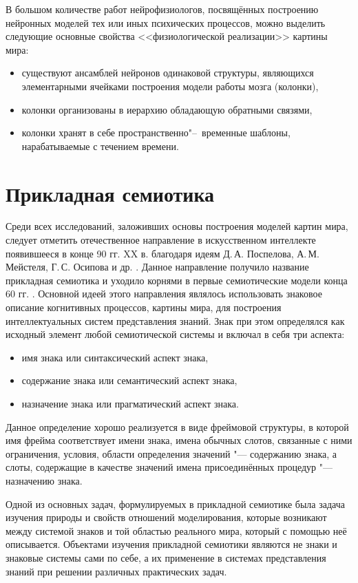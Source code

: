 В большом количестве работ нейрофизиологов, посвящённых построению нейронных моделей тех или иных психических процессов, можно выделить следующие основные свойства <<физиологической реализации>> картины мира:
\begin{itemize}
	\item существуют ансамблей нейронов одинаковой структуры, являющихся элементарными ячейками построения модели работы мозга (колонки),
	\item колонки организованы в иерархию обладающую обратными связями,
	\item колонки хранят в себе пространственно"--~временные шаблоны, нарабатываемые с течением времени.
\end{itemize}

\section{Прикладная семиотика} \label{sect1_3}

Среди всех исследований, заложивших основы построения моделей картин мира, следует отметить отечественное направление в искусственном интеллекте появившееся в конце 90 гг. XX в. благодаря идеям Д.\,А. Поспелова, А.\,М. Мейстеля, Г.\,С. Осипова и др. \cite{Osipov1995,Pospelov1996,Ehrlich1997,Osipov1999,Osipov2000b,Osipov2002a,Osipov2002b}. Данное направление получило название прикладная семиотика и уходило корнями в первые семиотические модели конца 60 гг. \cite{Pospelov1976}. Основной идеей этого направления являлось использовать знаковое описание когнитивных процессов, картины мира, для построения интеллектуальных систем представления знаний. Знак при этом определялся как исходный элемент любой семиотической системы и включал в себя три аспекта:
\begin{itemize}
	\item имя знака или синтаксический аспект знака,
	\item содержание знака или семантический аспект знака,
	\item назначение знака или прагматический аспект знака.
\end{itemize}
Данное определение хорошо реализуется в виде фреймовой структуры, в которой имя фрейма соответствует имени знака, имена обычных слотов, связанные с ними ограничения, условия, области определения значений "--- содержанию знака, а слоты, содержащие в качестве значений имена присоединённых процедур "--- назначению знака. 

Одной из основных задач, формулируемых в прикладной семиотике была задача изучения природы и свойств отношений моделирования, которые возникают между системой знаков и той областью реального мира, который с помощью неё описывается. Объектами изучения прикладной семиотики являются не знаки и знаковые системы сами по себе, а  их применение в системах представления знаний при решении различных практических задач.

